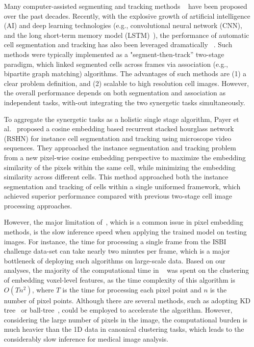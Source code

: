 \documentclass[journal,twoside,web]{ieeecolor}
\begin{document}
Many computer-assisted segmenting and tracking methods ~\cite{b4,b5,b6} have been proposed over the past decades. Recently, with the explosive growth of artificial intelligence (AI) and deep learning technologies (e.g., convolutional neural network (CNN), and the long short-term memory model (LSTM)~\cite{b10,b11}), the performance of automatic cell segmentation and tracking has also been leveraged dramatically ~\cite{b7,b8,b9,b12,b13,b14}. Such methods were typically implemented as a "segment-then-track” two-stage paradigm, which linked segmented cells across frames via association (e.g., bipartite graph matching) algorithms. The advantages of such methods are (1) a clear problem definition, and (2) scalable to high resolution cell images.  However, the overall performance depends on both segmentation and association as independent tasks, with-out integrating the two synergetic tasks simultaneously. 

To aggregate the synergetic tasks as a holistic single stage algorithm, Payer et al.~\cite{b15} proposed a cosine embedding based recurrent stacked hourglass network (RSHN) for instance cell segmentation and tracking using microscope video sequences. They approached the instance segmentation and tracking problem from a new pixel-wise cosine embedding perspective to maximize the embedding similarity of the pixels within the same cell, while minimizing the embedding similarity across different cells. This method approached both the instance segmentation and tracking of cells within a single uniformed framework, which achieved superior performance compared with previous two-stage cell image processing approaches.

However, the major limitation of~\cite{b15}, which is a common issue in pixel embedding methods, is the slow inference speed when applying the trained model on testing images. For instance, the time for processing a single frame from the ISBI challenge data-set can take nearly two minutes per frame, which is a major bottleneck of deploying such algorithms on large-scale data. Based on our analyses, the majority of the computational time in ~\cite{b15} was spent on the clustering of embedding voxel-level features, as the time complexity of this algorithm is $O(T{n^2})$, where $T$ is the time for processing each pixel point and $n$ is the number of pixel points. Although there are several methods, such as adopting KD tree~\cite{b16} or ball-tree~\cite{b17}, could be employed to accelerate the algorithm. However, considering the large number of pixels in the image, the computational burden is much heavier than the 1D data in canonical clustering tasks, which leads to the considerably slow inference for medical image analysis. 
\end{document}

